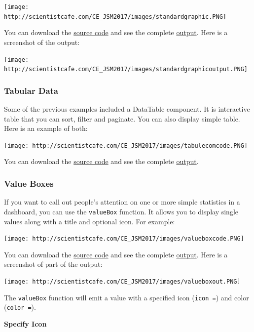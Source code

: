 \documentclass[]{book}
\theoremstyle{definition}
\theoremstyle{definition}
\theoremstyle{remark}
\begin{document}
\texttt{[image: http://scientistcafe.com/CE\_JSM2017/images/standardgraphic.PNG]}

You can download the
\href{http://scientistcafe.com/CE_JSM2017/Examples/basicgraphic.Rmd}{source
code} and see the complete
\href{http://scientistcafe.com/CE_JSM2017/Examples/basicgraphic.html}{output}.
Here is a screenshot of the output:

\texttt{[image: http://scientistcafe.com/CE\_JSM2017/images/standardgraphicoutput.PNG]}

\subsubsection{Tabular Data}\label{tabular-data}

Some of the previous examples included a DataTable component. It is
interactive table that you can sort, filter and paginate. You can also
display simple table. Here is an example of both:

\texttt{[image: http://scientistcafe.com/CE\_JSM2017/images/tabulecomcode.PNG]}

You can download the
\href{http://scientistcafe.com/CE_JSM2017/Examples/tabularcom.Rmd}{source
code} and see the complete
\href{http://scientistcafe.com/CE_JSM2017/Examples/tabularcom.html}{output}.

\subsubsection{Value Boxes}\label{value-boxes}

If you want to call out people's attention on one or more simple
statistics in a dashboard, you can use the \texttt{valueBox} function.
It allows you to display single values along with a title and optional
icon. For example:

\texttt{[image: http://scientistcafe.com/CE\_JSM2017/images/valueboxcode.PNG]}

You can download the
\href{http://scientistcafe.com/CE_JSM2017/Examples/valuebox.Rmd}{source
code} and see the complete
\href{http://scientistcafe.com/CE_JSM2017/Examples/valuebox.html}{output}.
Here is a screenshot of part of the output:

\texttt{[image: http://scientistcafe.com/CE\_JSM2017/images/valueboxout.PNG]}

The \texttt{valueBox} function will emit a value with a specified icon
(\texttt{icon\ =}) and color (\texttt{color\ =}).

\textbf{Specify Icon}
\end{document}
